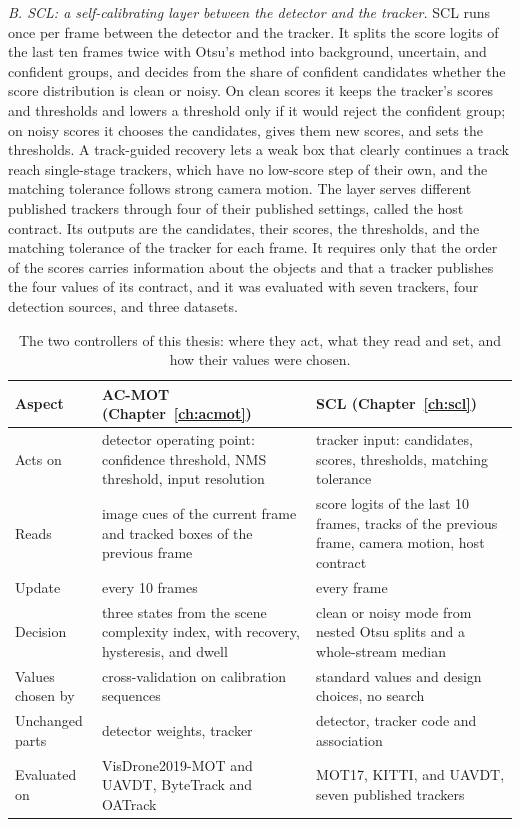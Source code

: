 \emph{B. SCL: a self-calibrating layer between the detector and the tracker.} SCL runs once per frame between the detector and the tracker. It splits the score logits of the last ten frames twice with Otsu's method \cite{goh2018otsu} into background, uncertain, and confident groups, and decides from the share of confident candidates whether the score distribution is clean or noisy. On clean scores it keeps the tracker's scores and thresholds and lowers a threshold only if it would reject the confident group; on noisy scores it chooses the candidates, gives them new scores, and sets the thresholds. A track-guided recovery lets a weak box that clearly continues a track reach single-stage trackers, which have no low-score step of their own, and the matching tolerance follows strong camera motion. The layer serves different published trackers through four of their published settings, called the host contract. Its outputs are the candidates, their scores, the thresholds, and the matching tolerance of the tracker for each frame. It requires only that the order of the scores carries information about the objects and that a tracker publishes the four values of its contract, and it was evaluated with seven trackers, four detection sources, and three datasets.

\begin{table}[tbp]
\centering
\caption{The two controllers of this thesis: where they act, what they read and set, and how their values were chosen.}
\label{tab:intro-controllers}
\begin{tabular}{>{\raggedright\arraybackslash}p{2.9cm}>{\raggedright\arraybackslash}p{5.5cm}>{\raggedright\arraybackslash}p{5.5cm}}
\toprule
Aspect & AC-MOT (Chapter~\ref{ch:acmot}) & SCL (Chapter~\ref{ch:scl})\\
\midrule
Acts on & detector operating point: confidence threshold, NMS threshold, input resolution & tracker input: candidates, scores, thresholds, matching tolerance\\
Reads & image cues of the current frame and tracked boxes of the previous frame & score logits of the last 10 frames, tracks of the previous frame, camera motion, host contract\\
Update & every 10 frames & every frame\\
Decision & three states from the scene complexity index, with recovery, hysteresis, and dwell & clean or noisy mode from nested Otsu splits and a whole-stream median\\
Values chosen by & cross-validation on calibration sequences & standard values and design choices, no search\\
Unchanged parts & detector weights, tracker & detector, tracker code and association\\
Evaluated on & VisDrone2019-MOT and UAVDT, ByteTrack and OATrack & MOT17, KITTI, and UAVDT, seven published trackers\\
\bottomrule
\end{tabular}
\end{table}

